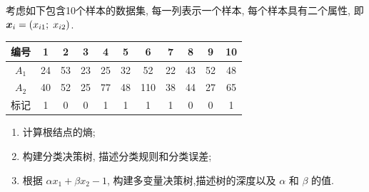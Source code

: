 \documentclass[answers]{exam}  %
\begin{document}
\begin{questions}
  考虑如下包含10个样本的数据集, 每一列表示一个样本, 每个样本具有二个属性, 即${\boldsymbol{x}}_i = (x_{i1};\; x_{i2})$.
  \begin{table}[ht]
    \begin{center}
      \begin{tabular}{ccccccccccc}
        \hline 编号  & 1  & 2  & 3  & 4  & 5  & 6   & 7  & 8  & 9  & 10 \\
        \hline $A_1$ & 24 & 53 & 23 & 25 & 32 & 52  & 22 & 43 & 52 & 48 \\
        $A_2$        & 40 & 52 & 25 & 77 & 48 & 110 & 38 & 44 & 27 & 65 \\
        \hline 标记  & 1  & 0  & 0  & 1  & 1  & 1   & 1  & 0  & 0  & 1  \\
        \hline
      \end{tabular}
    \end{center}
  \end{table}
  \begin{enumerate}
    \item 计算根结点的熵;
    \item 构建分类决策树, 描述分类规则和分类误差;
    \item 根据 $\alpha x_{1}+\beta x_{2}-1$,  构建多变量决策树,描述树的深度以及 $\alpha$ 和 $\beta$ 的值.
  \end{enumerate}
  \begin{solution}
  \end{solution}

\end{questions}
\end{document}
